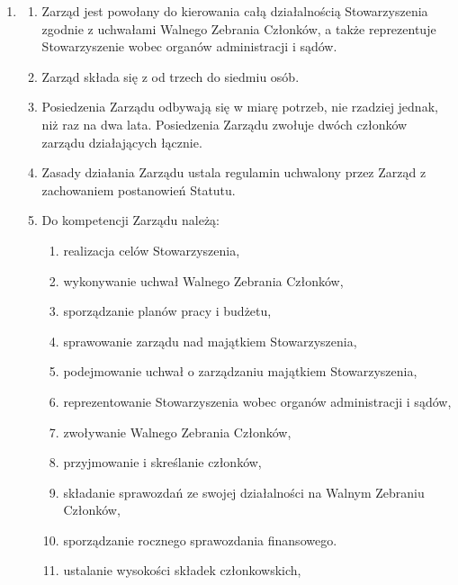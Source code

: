 \documentclass[chapterprefix,notitlepage]{article}
\begin{document}
\begin{enumerate}
	\item \begin{enumerate}
		\item Zarząd jest powołany do kierowania całą działalnością Stowarzyszenia zgodnie z uchwałami Walnego Zebrania Członków, a także reprezentuje Stowarzyszenie wobec organów administracji i sądów.
		\item Zarząd składa się z od trzech do siedmiu osób.
		\item Posiedzenia Zarządu odbywają się w miarę potrzeb, nie rzadziej jednak, niż raz na dwa lata. Posiedzenia Zarządu zwołuje dwóch członków zarządu działających łącznie.
		\item[3a.] Zasady działania Zarządu ustala regulamin uchwalony przez Zarząd z zachowaniem postanowień Statutu.
		\item Do kompetencji Zarządu należą:
		\begin{enumerate}
			\item realizacja celów Stowarzyszenia,
			\item wykonywanie uchwał Walnego Zebrania Członków,
			\item sporządzanie planów pracy i budżetu,
			\item sprawowanie zarządu nad majątkiem Stowarzyszenia,
			\item podejmowanie uchwał o zarządzaniu majątkiem Stowarzyszenia,
			\item reprezentowanie Stowarzyszenia wobec organów administracji i sądów,
			\item zwoływanie Walnego Zebrania Członków,
			\item przyjmowanie i skreślanie członków,
			\item składanie sprawozdań ze swojej działalności na Walnym Zebraniu Członków,
			\item sporządzanie rocznego sprawozdania finansowego.
			\item ustalanie wysokości składek członkowskich,
		\end{enumerate}
	\end{enumerate}


\end{enumerate}
\end{document}
